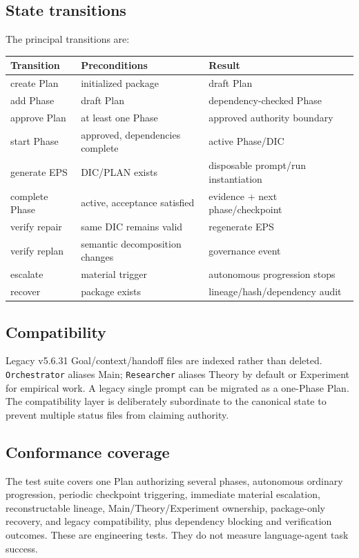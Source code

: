 \documentclass[11pt]{article}
\begin{document}
\subsection{State transitions}
The principal transitions are:
\begin{center}
\small
\begin{tabular}{lll}
\toprule
Transition & Preconditions & Result\\
\midrule
create Plan & initialized package & draft Plan\\
add Phase & draft Plan & dependency-checked Phase\\
approve Plan & at least one Phase & approved authority boundary\\
start Phase & approved, dependencies complete & active Phase/DIC\\
generate EPS & DIC/PLAN exists & disposable prompt/run instantiation\\
complete Phase & active, acceptance satisfied & evidence + next phase/checkpoint\\
verify repair & same DIC remains valid & regenerate EPS\\
verify replan & semantic decomposition changes & governance event\\
escalate & material trigger & autonomous progression stops\\
recover & package exists & lineage/hash/dependency audit\\
\bottomrule
\end{tabular}
\end{center}

\subsection{Compatibility}
Legacy v5.6.31 Goal/context/handoff files are indexed rather than deleted. \texttt{Orchestrator} aliases Main; \texttt{Researcher} aliases Theory by default or Experiment for empirical work. A legacy single prompt can be migrated as a one-Phase Plan. The compatibility layer is deliberately subordinate to the canonical state to prevent multiple status files from claiming authority.

\subsection{Conformance coverage}
The test suite covers one Plan authorizing several phases, autonomous ordinary progression, periodic checkpoint triggering, immediate material escalation, reconstructable lineage, Main/Theory/Experiment ownership, package-only recovery, and legacy compatibility, plus dependency blocking and verification outcomes. These are engineering tests. They do not measure language-agent task success.
\end{document}
